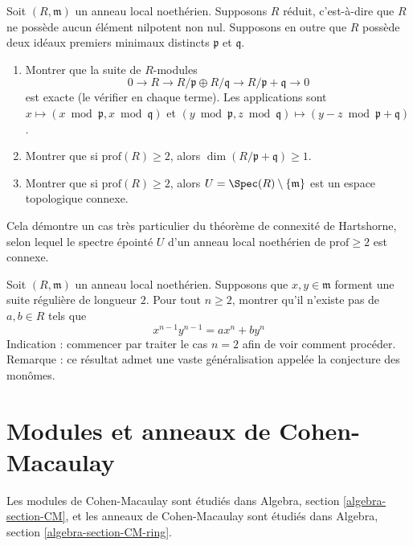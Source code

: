 \begin{exercise}
\label{exercise-Hartshorne-reduced}
Soit $(R, \mathfrak m)$ un anneau local noethérien.
Supposons $R$ réduit, c'est-à-dire que $R$ ne possède aucun élément
nilpotent non nul. Supposons en outre que $R$ possède deux
idéaux premiers minimaux distincts $\mathfrak p$ et $\mathfrak q$.
\begin{enumerate}
\item Montrer que la suite de $R$-modules
$$
0 \to R \to R/\mathfrak p \oplus R/\mathfrak q \to
R/\mathfrak p + \mathfrak q \to 0
$$
est exacte (le vérifier en chaque terme). Les applications sont
$x \mapsto (x \bmod \mathfrak p, x \bmod \mathfrak q)$
et $(y \bmod \mathfrak p, z \bmod \mathfrak q) \mapsto
(y - z \bmod \mathfrak p + \mathfrak q)$.
\item Montrer que si $\text{prof}(R) \geq 2$, alors
$\dim(R/\mathfrak p + \mathfrak q) \geq 1$.
\item Montrer que si $\text{prof}(R) \geq 2$, alors
$U = \Spec(R) \setminus \{\mathfrak m\}$ est un espace topologique
connexe.
\end{enumerate}
Cela démontre un cas très particulier du théorème de connexité de Hartshorne,
selon lequel le spectre épointé $U$ d'un anneau local
noethérien de $\text{prof} \geq 2$ est connexe.
\end{exercise}

\begin{exercise}
\label{exercise-depth-2}
Soit $(R, \mathfrak m)$ un anneau local noethérien.
Supposons que $x, y \in \mathfrak m$ forment une suite régulière de longueur $2$.
Pour tout $n \geq 2$, montrer qu'il n'existe pas de $a, b \in R$ tels que
$$
x^{n - 1}y^{n - 1} = a x^n + b y^n
$$
Indication : commencer par traiter le cas $n = 2$ afin de voir comment procéder.
Remarque : ce résultat admet une vaste généralisation
appelée la conjecture des monômes.
\end{exercise}







\section{Modules et anneaux de Cohen-Macaulay}
\label{section-CM}

\noindent
Les modules de Cohen-Macaulay sont étudiés dans
Algebra, section \ref{algebra-section-CM},
et les anneaux de Cohen-Macaulay sont étudiés dans
Algebra, section \ref{algebra-section-CM-ring}.

